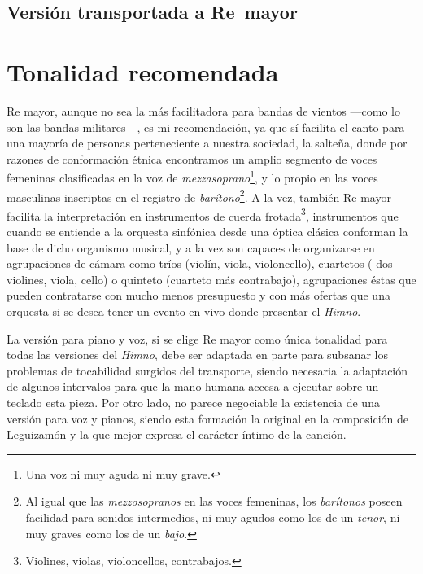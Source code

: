 \subsection[Versión transportada a Re\bemoltxt\ mayor]{Versión transportada a Re\bemol\ mayor}
\label{subsec:transporte-reb}



\section{Tonalidad recomendada}
\label{sec:tonalidad-recomendada}

Re mayor, aunque no sea la más facilitadora para bandas de vientos ---como lo son las bandas militares---, es mi recomendación, ya que sí facilita el canto para una mayoría de personas perteneciente a nuestra sociedad, la salteña, donde por razones de conformación étnica encontramos un amplio segmento de voces femeninas clasificadas en la voz de \emph{mezzasoprano}\footnote{Una voz ni muy aguda ni muy grave.}, y lo propio en las voces masculinas inscriptas en el registro de \emph{barítono}\footnote{Al igual que las \emph{mezzosopranos} en las voces femeninas, los \emph{barítonos} poseen facilidad para sonidos intermedios, ni muy agudos como los de un \emph{tenor}, ni muy graves como los de un \emph{bajo}.}. A la vez, también Re mayor facilita la interpretación en instrumentos de cuerda frotada\footnote{Violines, violas, violoncellos, contrabajos.}, instrumentos que cuando se entiende a la orquesta sinfónica desde una óptica clásica conforman la base de dicho organismo musical, y a la vez son capaces de organizarse en agrupaciones de cámara como tríos (violín, viola, violoncello), cuartetos ( dos violines, viola, cello) o quinteto (cuarteto más contrabajo), agrupaciones éstas que pueden contratarse con mucho menos presupuesto y con más ofertas que una orquesta si se desea tener un evento en vivo donde presentar el \emph{Himno}.

La versión para piano y voz, si se elige Re mayor como única tonalidad para todas las versiones del \emph{Himno}, debe ser adaptada en parte para subsanar los problemas de tocabilidad surgidos del transporte, siendo necesaria la adaptación de algunos intervalos para que la mano humana accesa a ejecutar sobre un teclado esta pieza. Por otro lado, no parece negociable la existencia de una versión para voz y pianos, siendo esta formación la original en la composición de Leguizamón y la que mejor expresa el carácter íntimo de la canción.


